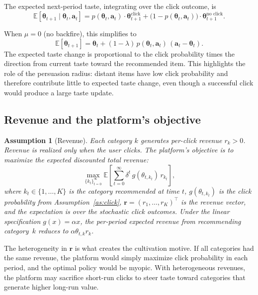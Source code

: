 \documentclass[11pt]{article}
\newtheorem{assumption}{Assumption}
\newcommand{\E}{\mathbb{E}}
\begin{document}
The expected next-period taste, integrating over the click outcome, is
\begin{equation}\label{eq:expected_transition}
\E[\boldsymbol{\theta}_{t+1} \mid \boldsymbol{\theta}_t, \mathbf{a}_t]
= p(\boldsymbol{\theta}_t, \mathbf{a}_t) \cdot \boldsymbol{\theta}_{t+1}^{\text{click}}
+ \bigl(1 - p(\boldsymbol{\theta}_t, \mathbf{a}_t)\bigr) \cdot \boldsymbol{\theta}_{t+1}^{\text{no click}}.
\end{equation}

When $\mu = 0$ (no backfire), this simplifies to
\begin{equation}\label{eq:expected_simple}
\E[\boldsymbol{\theta}_{t+1}] = \boldsymbol{\theta}_t + (1-\lambda) \, p(\boldsymbol{\theta}_t, \mathbf{a}_t) \, (\mathbf{a}_t - \boldsymbol{\theta}_t).
\end{equation}
The expected taste change is proportional to the click probability times the direction from current taste toward the recommended item. This highlights the role of the persuasion radius: distant items have low click probability and therefore contribute little to expected taste change, even though a successful click would produce a large taste update.

\subsection{Revenue and the platform's objective}

\begin{assumption}[Revenue]\label{as:revenue}
Each category $k$ generates per-click revenue $r_k > 0$. Revenue is realized only when the user clicks. The platform's objective is to maximize the expected discounted total revenue:
\begin{equation}\label{eq:objective}
\max_{\{k_t\}_{t=0}^{\infty}} \E \left[ \sum_{t=0}^{\infty} \delta^t \, g(\theta_{t,k_t}) \, r_{k_t} \right],
\end{equation}
where $k_t \in \{1, \ldots, K\}$ is the category recommended at time $t$, $g(\theta_{t,k_t})$ is the click probability from Assumption~\ref{as:click}, $\mathbf{r} = (r_1, \ldots, r_K)^\top$ is the revenue vector, and the expectation is over the stochastic click outcomes. Under the linear specification $g(x) = \alpha x$, the per-period expected revenue from recommending category~$k$ reduces to $\alpha \theta_{t,k} r_k$.
\end{assumption}

The heterogeneity in $\mathbf{r}$ is what creates the cultivation motive. If all categories had the same revenue, the platform would simply maximize click probability in each period, and the optimal policy would be myopic. With heterogeneous revenues, the platform may sacrifice short-run clicks to steer taste toward categories that generate higher long-run value.
\end{document}
